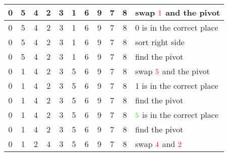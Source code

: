 \begin{center}
\begin{tabular}{ | c | c | c | c | c | c | c | c | c | c || l | }
        \color{cyan}0 & 5 & 4 & 2 & 3 & \color{red}1 & \cellcolor{LightGreen}6 & \cellcolor{LightGrey}9 & \cellcolor{LightGrey}7 & \cellcolor{LightGrey}8 &swap \(\color{red}1\) and the {\color{cyan}pivot}\\ \hline \hline
        \cellcolor{LightGreen}0 & 5 & 4 & 2 & 3 & 1 & \cellcolor{LightGreen}6 & \cellcolor{LightGrey}9 & \cellcolor{LightGrey}7 & \cellcolor{LightGrey}8 &{\color{green}0} is in the correct place\\ \hline
        \cellcolor{LightGreen}0 & \cellcolor{Amber}5 & \cellcolor{Amber}4 & \cellcolor{Amber}2 & \cellcolor{Amber}3 & \cellcolor{Amber}1 & \cellcolor{LightGreen}6 & \cellcolor{LightGrey}9 & \cellcolor{LightGrey}7 & \cellcolor{LightGrey}8 &sort {\color{DarkOrange}right side}\\ \hline \hline
        \cellcolor{LightGreen}0 & 5 & 4 & 2 & 3 & \cellcolor{LightCyan}1 & \cellcolor{LightGreen}6 & \cellcolor{LightGrey}9 & \cellcolor{LightGrey}7 & \cellcolor{LightGrey}8 &find the {\color{cyan}pivot} \\ \hline
        \cellcolor{LightGreen}0 & \color{cyan}1 & 4 & 2 & 3 & \color{red}5 & \cellcolor{LightGreen}6 & \cellcolor{LightGrey}9 & \cellcolor{LightGrey}7 & \cellcolor{LightGrey}8 &swap \(\color{red}5\) and the {\color{cyan}pivot} \\ \hline
        \cellcolor{LightGreen}0 & \cellcolor{LightGreen}1 & 4 & 2 & 3 & 5 & \cellcolor{LightGreen}6 & \cellcolor{LightGrey}9 & \cellcolor{LightGrey}7 & \cellcolor{LightGrey}8 &{\color{green}1} is in the correct place \\ \hline
        \cellcolor{LightGreen}0 & \cellcolor{LightGreen}1 & 4 & 2 & 3 & \cellcolor{LightCyan}5 & \cellcolor{LightGreen}6 & \cellcolor{LightGrey}9 & \cellcolor{LightGrey}7 & \cellcolor{LightGrey}8 &find the {\color{cyan}pivot} \\ \hline
        \cellcolor{LightGreen}0 & \cellcolor{LightGreen}1 & 4 & 2 & 3 & \cellcolor{LightGreen}5 & \cellcolor{LightGreen}6 & \cellcolor{LightGrey}9 & \cellcolor{LightGrey}7 & \cellcolor{LightGrey}8 &\(\color{green}5\) is in the correct place \\ \hline
        \cellcolor{LightGreen}0 & \cellcolor{LightGreen}1 & 4 & 2 & \cellcolor{LightCyan}3 & \cellcolor{LightGreen}5 & \cellcolor{LightGreen}6 & \cellcolor{LightGrey}9 & \cellcolor{LightGrey}7 & \cellcolor{LightGrey}8 &find the {\color{cyan}pivot} \\ \hline
        \cellcolor{LightGreen}0 & \cellcolor{LightGreen}1 & \color{red}2 & \color{red}4 & \cellcolor{LightCyan}3 & \cellcolor{LightGreen}5 & \cellcolor{LightGreen}6 & \cellcolor{LightGrey}9 & \cellcolor{LightGrey}7 & \cellcolor{LightGrey}8 &swap \(\color{red}4\) and \(\color{red}2\) \\ \hline

\end{tabular}
\end{center}
